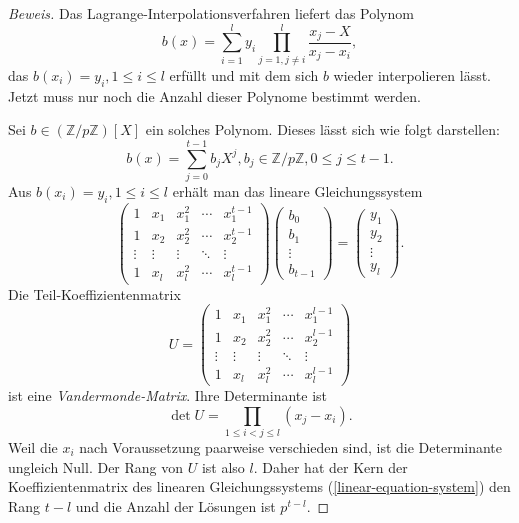 \documentclass[12pt, a4paper, oneside, titlepage]{report}
\newcommand{\Z}{\mathds{Z}}
\newenvironment{bew}{\begin{proof}[Beweis]}{\end{proof}}
\theoremstyle{definition}
\begin{document}
	\begin{bew}
		Das Lagrange-Interpolationsverfahren liefert das Polynom
		\begin{equation}\label{lagrange-polynom}
		b(x) = \sum_{i=1}^{l} y_i \prod_{j=1, j \neq i}^{l} \frac{x_j - X}{x_j - x_i},\end{equation} das $ b(x_i) = y_i, 1 \leq i \leq l $ erfüllt und mit dem sich $ b $ wieder interpolieren lässt. Jetzt muss nur noch die Anzahl dieser Polynome bestimmt werden.
		
		Sei $ b \in (\Z / p\Z)[X] $ ein solches Polynom. Dieses lässt sich wie folgt darstellen:
		$$ b(x) = \sum_{j=0}^{t-1} b_j X^j, b_j \in \Z / p\Z, 0 \leq j \leq t-1. $$
		Aus $ b(x_i) = y_i, 1 \leq i \leq l $ erhält man das lineare Gleichungssystem
		\begin{equation}\label{linear-equation-system}
			\begin{pmatrix}
			1 & x_1 & x_1^2 & \cdots & x_1^{t-1} \\
			1 & x_2 & x_2^2 & \cdots & x_2^{t-1} \\
			\vdots & \vdots & \vdots & \ddots & \vdots \\     
			1 & x_l & x_l^2 & \cdots & x_l^{t-1}
			\end{pmatrix}
			\begin{pmatrix}
			b_0 \\
			b_1 \\
			\vdots \\     
			b_{t-1}
			\end{pmatrix}
			=
			\begin{pmatrix}
			y_1 \\
			y_2 \\
			\vdots \\     
			y_l
			\end{pmatrix}.
		\end{equation}		
		Die Teil-Koeffizientenmatrix
		$$ U =
		\begin{pmatrix}
		1 & x_1 & x_1^2 & \cdots & x_1^{l-1} \\
		1 & x_2 & x_2^2 & \cdots & x_2^{l-1} \\
		\vdots & \vdots & \vdots & \ddots & \vdots \\     
		1 & x_l & x_l^2 & \cdots & x_l^{l-1}
		\end{pmatrix} $$
		ist eine \emph{Vandermonde-Matrix}. Ihre Determinante ist
		$$ \det U = \prod_{1 \leq i < j \leq l} (x_j-x_i). $$
		Weil die $ x_i $ nach Voraussetzung paarweise verschieden sind, ist die Determinante ungleich Null. Der Rang von $ U $ ist also $ l $. Daher hat der Kern der Koeffizientenmatrix des linearen Gleichungssystems (\ref{linear-equation-system}) den Rang $ t-l $ und die Anzahl der Lösungen ist $ p^{t-l} $.
	\end{bew}
	
\end{document}
